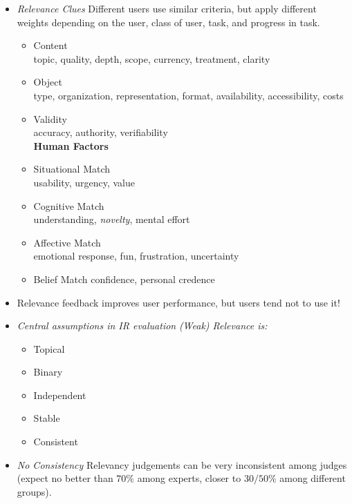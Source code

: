 \documentclass{article}
\newcommand{\note}[1]{{\footnotesize #1}}
\newcommand{\hii}[1]{{\it #1}}
\newcommand{\hiii}[1]{{\it #1}}
\begin{document}
\begin{itemize}
    
\item \hii{Relevance Clues}
    Different users use similar criteria, but apply different weights depending on the user, class of user, task, and progress in task.
    \begin{itemize}
    {\bf Criteria:}\\
    {\bf Information Factors}
    \item Content \\
        \note{topic, quality, depth, scope, currency, treatment, clarity}
    \item Object \\
        \note{type, organization, representation, format, availability, accessibility, costs}
    \item Validity \\
        \note{accuracy, authority, verifiability} \\
    {\bf Human Factors}
    \item Situational Match \\
        \note{usability, urgency, value}
    \item Cognitive Match \\
        \note{understanding, \emph{novelty}, mental effort}
    \item Affective Match \\
        \note{emotional response, fun, frustration, uncertainty}
    \item Belief Match
        \note{confidence, personal credence}
    \end{itemize}

\item Relevance feedback improves user performance, but users tend not to use it!

\item \hii{Central assumptions in IR evaluation}
    \hiii{\emph{(Weak)} Relevance is:}
    \begin{itemize}
    \item Topical
    \item Binary
    \item Independent
    \item Stable
    \item Consistent
    \end{itemize}

\item \hii{No Consistency}  Relevancy judgements can be very inconsistent among judges (expect no better than $70$\% among experts, closer to $30/50$\% among different groups).


\end{itemize}
\end{document}
